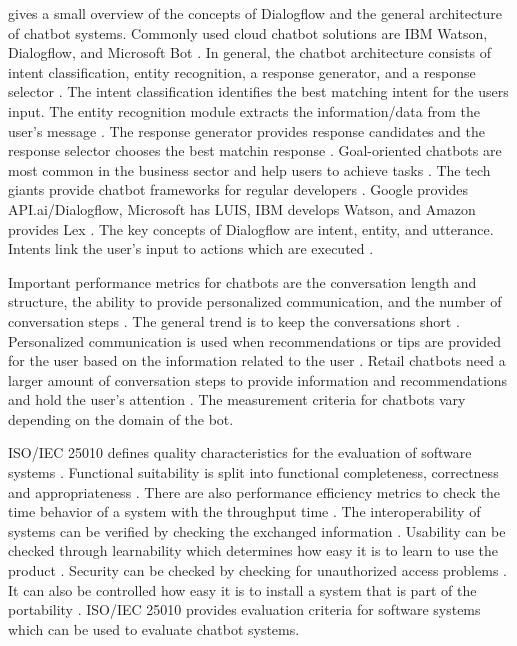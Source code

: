 \citet{rahman2017programming} gives a small overview of the concepts of Dialogflow and the general architecture of chatbot systems.
Commonly used cloud chatbot solutions are IBM Watson, Dialogflow, and Microsoft Bot \cite{rahman2017programming}.
In general, the chatbot architecture consists of intent classification, entity recognition, a response generator, 
and a response selector \cite{rahman2017programming}. 
The intent classification identifies the best matching intent for the users input.
The entity recognition module extracts the information/data from the user's message \cite{rahman2017programming}.
The response generator provides response candidates and the response selector chooses the best matchin response \cite{rahman2017programming}.
Goal-oriented chatbots are most common in the business sector and help users to achieve tasks \cite{rahman2017programming}.
The tech giants provide chatbot frameworks for regular developers \cite{rahman2017programming}.
Google provides API.ai/Dialogflow, Microsoft has LUIS, IBM develops Watson, and Amazon provides Lex \cite{rahman2017programming}.
The key concepts of Dialogflow are intent, entity, and utterance.
Intents link the user's input to actions which are executed \cite{rahman2017programming}.

Important performance metrics for chatbots are the conversation length and structure, the ability to 
provide personalized communication, and the number of conversation steps \cite{PRZEGALINSKA2019785}.
The general trend is to keep the conversations short \cite{PRZEGALINSKA2019785}.
Personalized communication is used when recommendations or tips are provided for the user based on the 
information related to the user \cite{PRZEGALINSKA2019785}.
Retail chatbots need a larger amount of conversation steps to provide information and recommendations 
and hold the user's attention \cite{PRZEGALINSKA2019785}.
The measurement criteria for chatbots vary depending on the domain of the bot.


ISO/IEC 25010 defines quality characteristics for the evaluation of software systems \cite{iso25010}.
Functional suitability is split into functional completeness, correctness and appropriateness \cite{iso25010}.
There are also performance efficiency metrics to check the time behavior of a system with the throughput time \cite{iso25010}.
The interoperability of systems can be verified by checking the exchanged information \cite{iso25010}.
Usability can be checked through learnability which determines how easy it is to learn to use the product \cite{iso25010}.
Security can be checked by checking for unauthorized access problems \cite{iso25010}.
It can also be controlled how easy it is to install a system that is part of the portability \cite{iso25010}.
ISO/IEC 25010 provides evaluation criteria for software systems which can be used to evaluate chatbot systems.


